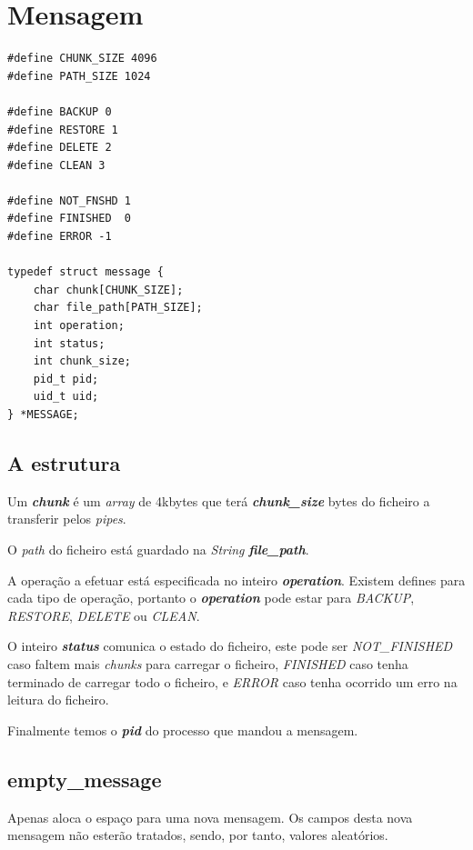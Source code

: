 \documentclass[12pt,a4paper]{report}
\begin{document}
\chapter{Mensagem}

\begin{lstlisting}
#define CHUNK_SIZE 4096
#define PATH_SIZE 1024

#define BACKUP 0
#define RESTORE 1
#define DELETE 2
#define CLEAN 3

#define NOT_FNSHD 1
#define FINISHED  0 
#define ERROR -1

typedef struct message {
    char chunk[CHUNK_SIZE];
    char file_path[PATH_SIZE];
    int operation;
    int status;
    int chunk_size;
    pid_t pid;
    uid_t uid;
} *MESSAGE;
\end{lstlisting}

\section{A estrutura}

\hspace{0cm}\par
Um \emph{\bfseries{chunk}} é um \emph{array} de 4kbytes que terá \emph{\bfseries{chunk\_size}} bytes do ficheiro a transferir pelos \emph{pipes}. \par
O \emph{path} do ficheiro está guardado na \emph{String} \emph{\bfseries{file\_path}}. \par
A operação a efetuar está especificada no inteiro \emph{\bfseries{operation}}. Existem defines para cada tipo de operação, portanto o \emph{\bfseries{operation}} pode estar para \emph{BACKUP}, \emph{RESTORE}, \emph{DELETE} ou \emph{CLEAN}. \par
O inteiro \emph{\bfseries{status}} comunica o estado do ficheiro, este pode ser \emph{NOT\_FINISHED} caso faltem mais \emph{chunks} para carregar o ficheiro, \emph{FINISHED} caso tenha terminado de carregar todo o ficheiro, e \emph{ERROR} caso tenha ocorrido um erro na leitura do ficheiro.\par
Finalmente temos o \emph{\bfseries{pid}} do processo que mandou a mensagem.

\section{empty\_message}
Apenas aloca o espaço para uma nova mensagem. Os campos desta nova mensagem não esterão tratados, sendo, por tanto, valores aleatórios.\par
\end{document}
